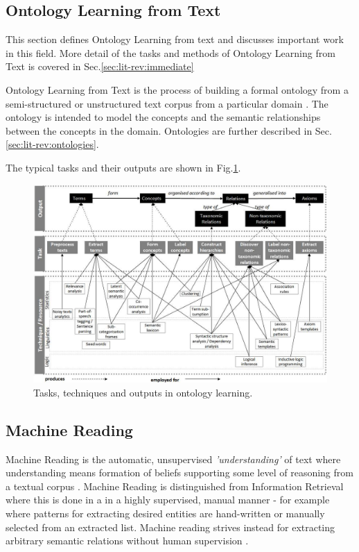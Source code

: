 \documentclass[a4paper]{report}
\begin{document}
\subsection{Ontology Learning from Text}

This section defines Ontology Learning from text and discusses important work in this field. More detail of the tasks and methods of Ontology Learning from Text is covered in Sec.\ref{sec:lit-rev:immediate}

Ontology Learning from Text is the process of building a formal ontology from a semi-structured or unstructured text corpus from a particular domain \citep[p.3-7]{Cimiano06}.
The ontology is intended to model the concepts and the semantic relationships between the concepts in the domain.
Ontologies are further described in Sec.\ref{sec:lit-rev:ontologies}. 

The typical tasks and their outputs are shown in Fig.\ref{fig:output-task-technique}. 

\begin{figure}
  \includegraphics[width=\textwidth]{graphics/output-task-technique-WongLiuBennamoun.png}
  \caption{Tasks, techniques and outputs in ontology learning. \cite{Wong2009PhD}}
  \label{fig:output-task-technique}
\end{figure}


\subsection{Machine Reading}

Machine Reading is the automatic, unsupervised \emph{'understanding'} of text where understanding means formation of beliefs supporting some level of reasoning from a textual corpus \citep{EtzioniEtAll06MachineReading}.
Machine Reading is distinguished from Information Retrieval where this is done in a in a highly supervised, manual manner - for example where patterns for extracting desired entities are hand-written or manually selected from an extracted list.
Machine reading strives instead for extracting arbitrary semantic relations without human supervision \citep{EtzioniEtAll06MachineReading}.
\end{document}

